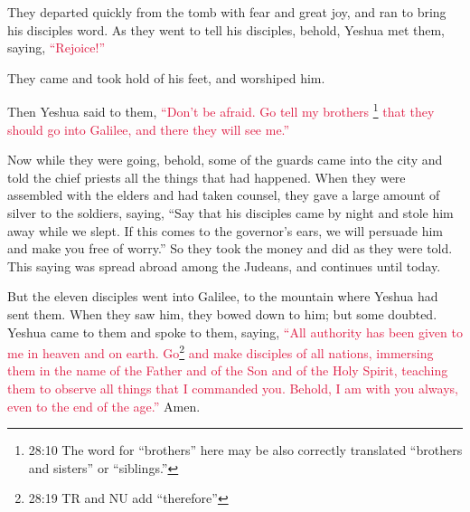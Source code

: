 \myverse{}They departed quickly from the tomb with fear and great joy, and
ran to bring his disciples word.
\myverse{}As they went to tell his disciples, behold, Yeshua met them, saying,
\textcolor{crimson}{“Rejoice!”}

They came and took hold of his feet, and worshiped him.

\myverse{}Then Yeshua said to them,
\textcolor{crimson}{“Don’t be afraid. Go tell my brothers
}\footnote{28:10 The word for “brothers” here may be also correctly translated “brothers and sisters” or “siblings.”}
\textcolor{crimson}{that they should go into Galilee, and there they will see me.”}

\myverse{}Now while they were going, behold, some of the guards came into
the city and told the chief priests all the things that had happened.
\myverse{}When they were assembled with the elders and had taken counsel, they gave
a large amount of silver to the soldiers,
\myverse{}saying, “Say that his disciples came by night and stole him away while we
slept.
\myverse{}If this comes to the governor’s ears, we will persuade him and make you free
of worry.”
\myverse{}So they took the money and did as they were told. This saying was spread
abroad among the Judeans, and continues until today.

\myverse{}But the eleven disciples went into Galilee, to the mountain
where Yeshua had sent them.
\myverse{}When they saw him, they bowed down to him; but some doubted.
\myverse{}Yeshua came to them and spoke to them, saying,
\textcolor{crimson}{“All authority has been given to me in heaven and on earth.
}
\myverse{}\textcolor{crimson}{Go}\footnote{28:19 TR and NU add “therefore”}
\textcolor{crimson}{and make disciples of all nations, immersing them in the name of the Father and of the Son and of
	the Holy Spirit,
}
\myverse{}\textcolor{crimson}{teaching them to observe all things that I commanded you. Behold, I am
	with you always, even to the end of the age.”} Amen.


